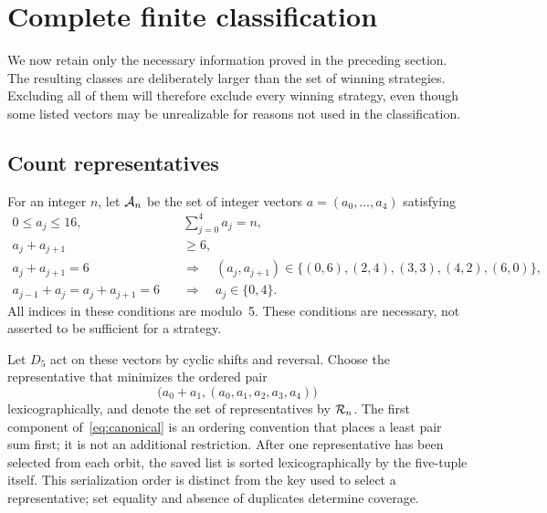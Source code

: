 \section{Complete finite classification}\label{sec:classification}
We now retain only the necessary information proved in the preceding
section. The resulting classes are deliberately larger than the set of
winning strategies. Excluding all of them will therefore exclude every
winning strategy, even though some listed vectors may be unrealizable
for reasons not used in the classification.
\subsection{Count representatives}
For an integer $n$, let $\mathcal{A}_n$ be the set of integer vectors
$a=(a_0,\ldots,a_4)$ satisfying
\begin{align}
0\leq a_j\leq16,\qquad&\sum_{j=0}^4a_j=n,\label{eq:A1}\\
a_j+a_{j+1}&\geq6,\label{eq:A2}\\
a_j+a_{j+1}=6\quad&\Longrightarrow\quad
(a_j,a_{j+1})\in\{(0,6),(2,4),(3,3),(4,2),(6,0)\},\label{eq:A3}\\
a_{j-1}+a_j=a_j+a_{j+1}=6\quad&\Longrightarrow\quad
a_j\in\{0,4\}.\label{eq:A4}
\end{align}
All indices in these conditions are modulo~5. These conditions are
necessary, not asserted to be sufficient for a strategy.

Let $D_5$ act on these vectors by cyclic shifts and reversal. Choose the
representative that minimizes the ordered pair
\begin{equation}\label{eq:canonical}
\bigl(a_0+a_1,(a_0,a_1,a_2,a_3,a_4)\bigr)
\end{equation}
lexicographically, and denote the set of representatives by $\mathcal{R}_n$.
The first component of~\eqref{eq:canonical} is an ordering convention
that places a least pair sum first; it is not an additional restriction.
After one representative has been selected from each orbit, the saved
list is sorted lexicographically by the five-tuple itself. This
serialization order is distinct from the key used to select a
representative; set equality and absence of duplicates determine coverage.

